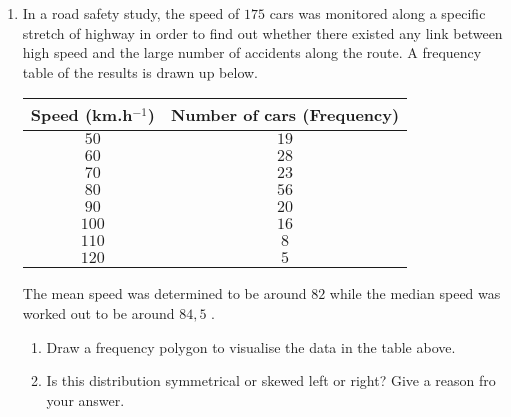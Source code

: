 {\begin{enumerate}
\item In a road safety study, the speed of $175$ cars was monitored along a specific stretch of highway in order to find out whether there existed any link between high speed and the large number of accidents along the route. A frequency table of the results is drawn up below.
\begin{center}
\begin{tabular}{|c|c|}\hline
\textbf{Speed (km.h$^{-1}$)} & \textbf{Number of cars (Frequency)} \\\hline
 $50$ & $19$ \\\hline
 $60$ & $28$ \\\hline
 $70$ & $23$ \\\hline
 $80$ & $56$ \\\hline
 $90$ & $20$ \\\hline
 $100$ & $16$ \\\hline
 $110$ & $8$ \\\hline
 $120$ & $5$ \\\hline
\end{tabular}
\end{center}
The mean speed was determined to be around $82$ \kph while the median speed was worked out to be around $84,5$ \kph.
\begin{enumerate}
\item Draw a frequency polygon to visualise the data in the table above.
\item Is this distribution symmetrical or skewed left or right? Give a reason fro your answer.
\end{enumerate}

\end{enumerate}

}

